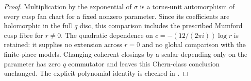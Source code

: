 \begin{proof}
Multiplication by the exponential of $\sigma$
is a torus-unit automorphism of every cusp fan
chart for a fixed nonzero parameter.  Since its
coefficients are holomorphic in the full $q$
disc, this comparison includes the prescribed
Mumford cusp fibre for $r\ne0$.  The quadratic
dependence on $c=-(12/(2\pi i))\log r$ is retained:
it supplies no extension across $r=0$ and no
global comparison with the finite-place models.
Changing coherent closings by a scalar depending
only on the parameter has zero $q$ commutator
and leaves this Chern-class conclusion unchanged.
The explicit polynomial identity is checked in
.
\end{proof}
